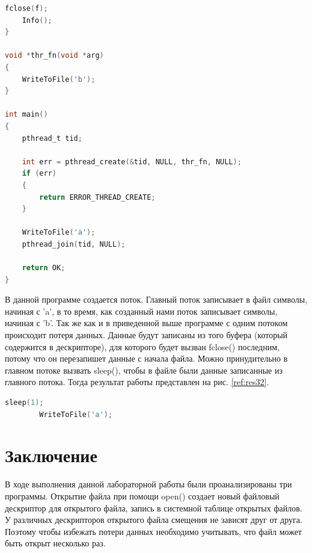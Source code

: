 \documentclass[a4paper,oneside,12pt]{extreport}
\begin{document}
\begin{task}
\begin{lstlisting}[language=C]
    fclose(f);
    Info();
}

void *thr_fn(void *arg)
{
    WriteToFile('b');
}

int main()
{
    pthread_t tid;

    int err = pthread_create(&tid, NULL, thr_fn, NULL);
    if (err)
    {
        return ERROR_THREAD_CREATE;
    }

    WriteToFile('a');
    pthread_join(tid, NULL);

    return OK;
}
    \end{lstlisting}

    В данной программе создается поток.
    Главный поток записывает в файл символы, начиная с 'a', в то время, как созданный
    нами поток записывает символы, начиная с 'b'. 
    Так же как и в приведенной выше программе с одним потоком происходит потеря данных.
    Данные будут записаны из того буфера (который содержится в дескрипторе), для которого
    будет вызван fclose() последним, потому что он перезапишет данные с начала файла.
    Можно принудительно в главном потоке вызвать sleep(), чтобы в файле были данные 
    записанные из главного потока. Тогда результат работы представлен на рис. \ref{ref:res32}.
    
    \begin{lstlisting}[language=C]
        sleep(1);
        WriteToFile('a');
    \end{lstlisting}

\end{task}

\section*{Заключение}

В ходе выполнения данной лабораторной работы были проанализированы три программы.
Открытие файла при помощи open() создает новый файловый дескриптор для открытого 
файла, запись в системной таблице открытых файлов.
У различных дескрипторов открытого файла смещения не зависят друг от друга.
Поэтому чтобы избежать потери данных необходимо учитывать, что файл может быть открыт 
несколько раз.
\end{document}
